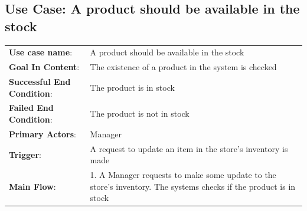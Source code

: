 \documentclass[12pt]{article}
\begin{document}
\subsection*{Use Case: A product should be available in the stock}
\begin{center}
\begin{tabular}{ l p{} }
    \textbf{Use case name}: & A product should be available in the stock \\
    \textbf{Goal In Content}: & The existence of a product in the system is checked \\
    \textbf{Successful End Condition}: & The product is in stock \\
    \textbf{Failed End Condition}: & The product is not in stock \\
    \textbf{Primary Actors}: & Manager  \\
    \textbf{Trigger}: & A request to update an item in the store’s inventory is made  \\
    \textbf{Main Flow}: & 1. A Manager requests to make some update to the store’s inventory\newline 2. The systems checks if the product is in stock
\end{tabular}
\end{center}
\end{document}
